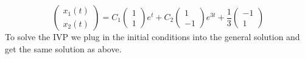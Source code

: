 \begin{equation}
  \begin{pmatrix} x_1(t) \\ x_2(t) \end{pmatrix} =
  C_1 \begin{pmatrix} 1 \\ 1 \end{pmatrix} e^t +
  C_2 \begin{pmatrix} 1 \\ -1\end{pmatrix} e^{3t} +
  \frac{1}{3} \begin{pmatrix} -1 \\ 1 \end{pmatrix}
\end{equation}
To solve the IVP we plug in the initial conditions into the general solution and get the same solution as above.
